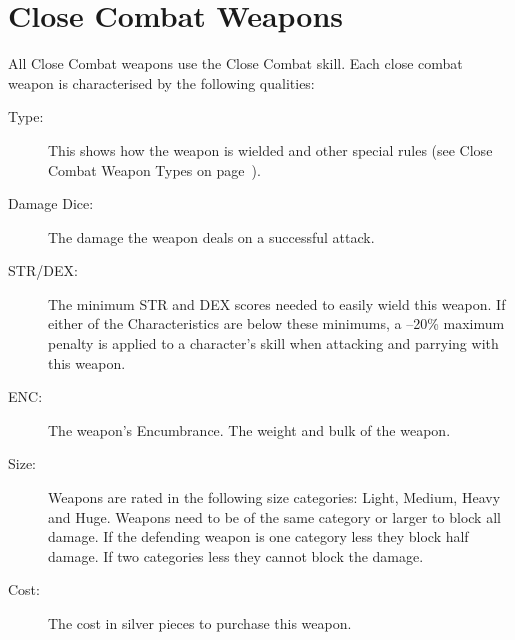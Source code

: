 \section{Close Combat Weapons}
All Close Combat weapons use the Close Combat skill. Each close combat weapon is characterised by the following qualities: 

\begin{description}
	\item[Type:] This shows how the weapon is wielded and other special rules (see Close Combat Weapon Types on page~\pageref{sssec:close-combat-weapon-types}).
	\item[Damage Dice:] The damage the weapon deals on a successful attack. 
	\item[STR/DEX:] The minimum STR and DEX scores needed to easily wield this weapon. If either of the Characteristics are below these minimums, a –20\% maximum penalty is applied to a character’s skill when attacking and parrying with this weapon. 
	\item[ENC:] The weapon’s Encumbrance. The weight and bulk of the weapon. 
	\item[Size:] Weapons are rated in the following size categories: Light, Medium, Heavy and Huge. Weapons need to be of the same category or larger to block all damage. If the defending weapon is one category less they block half damage. If two categories less they cannot block the damage.
	\item[Cost:] The cost in silver pieces to purchase this weapon. 
\end{description}

